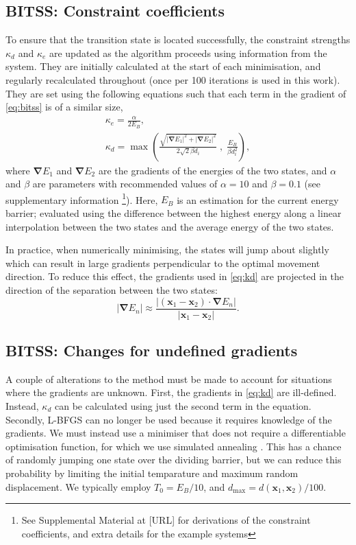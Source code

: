 \documentclass[twocolumn,10pt]{revtex4-2}
\newcommand{\abs}[1]{\left| #1 \right|}
\newcommand{\grad}{\bm{\nabla}}
\begin{document}
\subsection{BITSS: Constraint coefficients}
To ensure that the transition state is located successfully, the constraint strengths $\kappa_d$ and $\kappa_e$ are updated as the algorithm proceeds using information from the system.
They are initially calculated at the start of each minimisation, and regularly recalculated throughout (once per 100 iterations is used in this work).
They are set using the following equations such that each term in the gradient of \cref{eq:bitss} is of a similar size,
\begin{gather}
  \kappa_e = \frac {\alpha} {2 E_B},
  \label{eq:ke}
  \\
  \kappa_d = \max \left(
    \frac {\sqrt{\abs{\grad E_1}^2 + \abs{\grad E_2}^2}} {2\sqrt{2} \beta d_i} \; , \;
    \frac{E_B}{\beta d_i^2} \right),
  \label{eq:kd}
\end{gather}
where $\grad E_1$ and $\grad E_2$ are the gradients of the energies of the two states, and $\alpha$ and $\beta$ are parameters with recommended values of $\alpha = 10$ and $\beta = 0.1$ (see supplementary information \footnote{See Supplemental Material at [URL] for derivations of the constraint coefficients, and extra details for the example systems}).
Here, $E_B$ is an estimation for the current energy barrier; evaluated using the difference between the highest energy along a linear interpolation between the two states and the average energy of the two states.

In practice, when numerically minimising, the states will jump about slightly which can result in large gradients perpendicular to the optimal movement direction.
To reduce this effect, the gradients used in \cref{eq:kd} are projected in the direction of the separation between the two states:
\begin{equation}
  \abs{\grad E_n} \approx \frac {\abs{(\bm{x}_1 - \bm{x}_2) \cdot \grad E_n}} {\abs{\bm{x}_1 - \bm{x}_2}}.
\end{equation}

\subsection{BITSS: Changes for undefined gradients}
A couple of alterations to the method must be made to account for situations where the gradients are unknown.
First, the gradients in \cref{eq:kd} are ill-defined.
Instead, $\kappa_d$ can be calculated using just the second term in the equation.
Secondly, L-BFGS can no longer be used because it requires knowledge of the gradients.
We must instead use a minimiser that does not require a differentiable optimisation function, for which we use simulated annealing \cite{Kirkpatrick1983}.
This has a chance of randomly jumping one state over the dividing barrier, but we can reduce this probability by limiting the initial temparature and maximum random displacement.
We typically employ $T_0 = E_B / 10$, and $d_\text{max} = d(\bm{x}_1, \bm{x}_2) / 100$.
\end{document}
